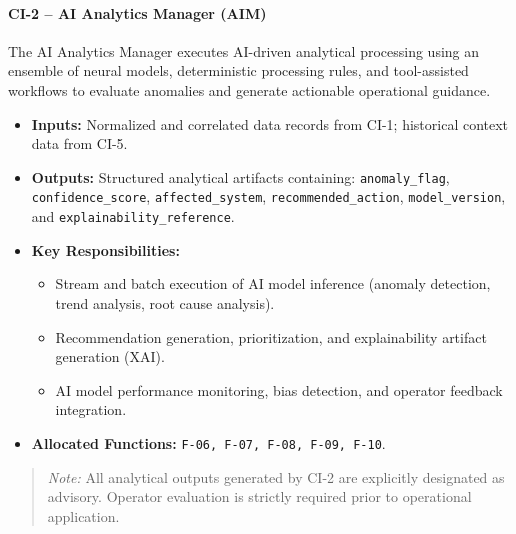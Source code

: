 \paragraph{CI-2 -- AI Analytics Manager (AIM)}
The AI Analytics Manager executes AI-driven analytical processing using an ensemble of neural models, deterministic processing rules, and tool-assisted workflows to evaluate anomalies and generate actionable operational guidance.
\begin{itemize}
    \item \textbf{Inputs:} Normalized and correlated data records from CI-1; historical context data from CI-5.
    \item \textbf{Outputs:} Structured analytical artifacts containing: \texttt{anomaly\_flag}, \texttt{confidence\_score}, \texttt{affected\_system}, \texttt{recommended\_action}, \texttt{model\_version}, and \texttt{explainability\_reference}.
    \item \textbf{Key Responsibilities:}
    \begin{itemize}
        \item Stream and batch execution of AI model inference (anomaly detection, trend analysis, root cause analysis).
        \item Recommendation generation, prioritization, and explainability artifact generation (XAI).
        \item AI model performance monitoring, bias detection, and operator feedback integration.
    \end{itemize}
    \item \textbf{Allocated Functions:} \texttt{F-06, F-07, F-08, F-09, F-10}.
\end{itemize}
\begin{quote}
\textit{Note:} All analytical outputs generated by CI-2 are explicitly designated as advisory. Operator evaluation is strictly required prior to operational application.
\end{quote}

